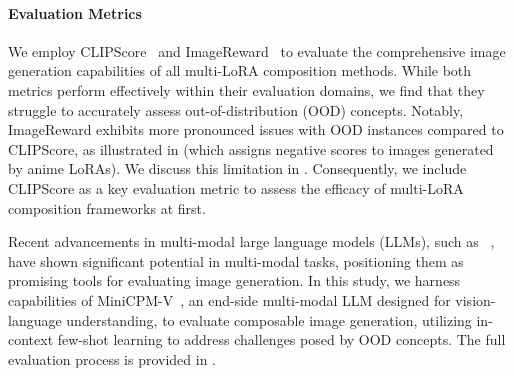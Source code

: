 
\paragraph{Evaluation Metrics}
We employ CLIPScore~\citep{clipscore} and ImageReward~\citep{imagereward} to evaluate the comprehensive image generation capabilities of all multi-LoRA composition methods. While both metrics perform effectively within their evaluation domains, we find that they struggle to accurately assess out-of-distribution (OOD) concepts. Notably, ImageReward exhibits more pronounced issues with OOD instances compared to CLIPScore, as illustrated in  (which assigns negative scores to images generated by anime LoRAs). We discuss this limitation in . Consequently, we include CLIPScore as a key evaluation metric to assess the efficacy of multi-LoRA composition frameworks at first.


Recent advancements in multi-modal large language models (LLMs), such as ~\citet{minicpm, gpt4, gpt4v}, have shown significant potential in multi-modal tasks, positioning them as promising tools for evaluating image generation. In this study, we harness capabilities of MiniCPM-V~\citep{minicpm}, an end-side multi-modal LLM designed for vision-language understanding, to evaluate composable image generation, utilizing in-context few-shot learning to address challenges posed by OOD concepts. The full evaluation process is provided in . 
\vspace{-6pt}
